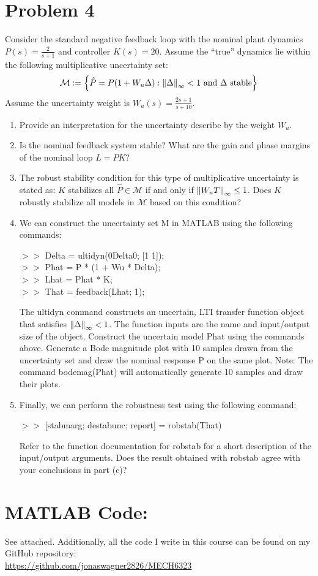 \documentclass[letter]{article}
\numberwithin{equation}{section}
\begin{document}
\section{Problem 4}
Consider the standard negative feedback loop with the nominal plant dynamics $P(s) = \frac{2}{s+1}$ and controller $K(s) = 20$. 
Assume the ``true'' dynamics lie within the following multiplicative uncertainty set:\[
    \mathcal{M} := \qty{
        \hat{P} = P (1 + W_{u} \Delta) : \norm{\Delta}_\infty < 1 \text{ and } \Delta \text{ stable}
    }
\] Assume the uncertainty weight is $W_{u}(s) = \frac{2s + 1}{s + 10}$.
\begin{enumerate}
    \item Provide an interpretation for the uncertainty describe by the weight $W_u$.
    \item Is the nominal feedback system stable?
    What are the gain and phase margins of the nominal loop $L = PK$?
    \item The robust stability condition for this type of multiplicative uncertainty is stated as: 
    $K$ stabilizes all $\hat{P} \in \mathcal{M}$ if and only if $\norm{W_{u} T}_\infty \leq 1$. 
    Does $K$ robustly stabilize all models in $\mathcal{M}$ based on this condition?
    \item We can construct the uncertainty set M in MATLAB using the following commands:
    \begin{center}
        $>>$ Delta = ultidyn(0Delta0; [1 1]);\\
        $>>$ Phat = P * (1 + Wu * Delta);\\
        $>>$ Lhat = Phat * K;\\
        $>>$ That = feedback(Lhat; 1);
    \end{center}
    The ultidyn command constructs an uncertain, LTI transfer function object that satisfies $\norm{\Delta}_\infty < 1$. 
    The function inputs are the name and input/output size of the object. 
    Construct the uncertain model Phat using the commands above. 
    Generate a Bode magnitude plot with 10 samples drawn from the uncertainty set and draw the nominal response P on the same plot. 
    Note: The command bodemag(Phat) will automatically generate 10 samples and draw their plots.
    \item Finally, we can perform the robustness test using the following command:
    \begin{center}
        $>>$ [stabmarg; destabunc; report] = robstab(That)
    \end{center}
    Refer to the function documentation for robstab for a short description of the input/output arguments. 
    Does the result obtained with robstab agree with your conclusions in part (c)?
\end{enumerate}


















\newpage
\appendix
\section{MATLAB Code:}\label{apx:matlab}
See attached.
Additionally, all the code I write in this course can be found on my GitHub repository:\\
\href{https://github.com/jonaswagner2826/MECH6323}{https://github.com/jonaswagner2826/MECH6323}
\end{document}
